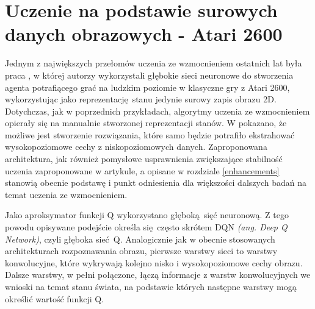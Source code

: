 \section{Uczenie na podstawie surowych danych obrazowych - Atari 2600}

Jednym z największych przełomów uczenia ze wzmocnieniem ostatnich lat była praca \break \cite{mnih2015human}, w której autorzy wykorzystali głębokie sieci neuronowe do stworzenia agenta potrafiącego grać na ludzkim poziomie w klasyczne gry z Atari 2600, wykorzystując jako reprezentację stanu jedynie surowy zapis obrazu 2D. Dotychczas, jak w poprzednich przykładach, algorytmy uczenia ze wzmocnieniem opierały się na manualnie stworzonej reprezentacji stanów. W \cite{mnih2015human} pokazano, że możliwe jest stworzenie rozwiązania, które samo będzie potrafiło ekstrahować wysokopoziomowe cechy z niskopoziomowych danych. Zaproponowana architektura, jak również pomysłowe usprawnienia zwiększające stabilność uczenia zaproponowane w artykule, a opisane w rozdziale \ref {enhancements} stanowią obecnie podstawę i punkt odniesienia dla większości dalszych badań na temat uczenia ze wzmocnieniem.

Jako aproksymator funkcji Q wykorzystano głęboką sięć neuronową. Z tego powodu opisywane podejście określa się często skrótem DQN \textit{(ang. Deep Q Network)}, czyli głęboka sieć Q. Analogicznie jak w obecnie stosowanych architekturach rozpoznawania obrazu, pierwsze warstwy sieci to warstwy konwolucyjne, które wykrywają kolejno nisko i wysokopoziomowe cechy obrazu. Dalsze warstwy, w pełni połączone, łączą informacje z warstw konwolucyjnych we wnioski na temat stanu świata, na podstawie których następne warstwy mogą określić wartość funkcji Q.


